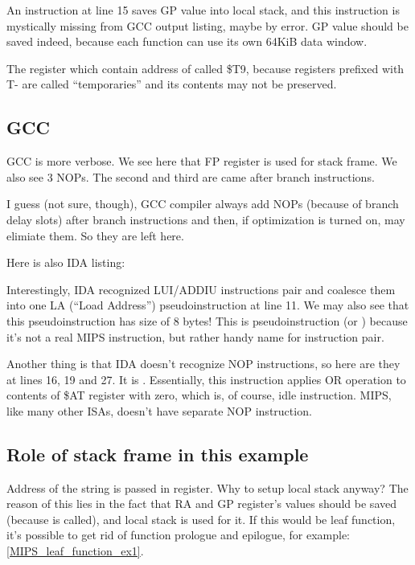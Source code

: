 An instruction at line 15 saves GP value into local stack, and this instruction is mystically missing
from GCC output listing, maybe by error.
GP value should be saved indeed, because each function can use its own 64KiB data window.

The register which contain address of \puts called \$T9, because registers prefixed with T- are called
``temporaries'' and its contents may not be preserved.

\subsection{\NonOptimizing GCC}



\NonOptimizing GCC is more verbose.
We see here that FP register is used for stack frame.
We also see 3 \ac{NOP}s.
The second and third are came after branch instructions.

I guess (not sure, though), GCC compiler always add \ac{NOP}s (because of branch delay slots) after branch
instructions and then, if optimization is turned on, may elimiate them.
So they are left here.

Here is also IDA listing:



Interestingly, IDA recognized LUI/ADDIU instructions pair and coalesce them into one 
LA (``Load Address'') pseudoinstruction at line 11.
We may also see that this pseudoinstruction has size of 8 bytes!
This is pseudoinstruction (or ) because it's not a real MIPS instruction, but rather
handy name for instruction pair.

Another thing is that IDA doesn't recognize \ac{NOP} instructions, so here are they at lines 16, 19 and 27.
It is . Essentially, this instruction applies OR operation to contents of \$AT register
with zero, which is, of course, idle instruction. 
MIPS, like many other \ac{ISA}s, doesn't have separate \ac{NOP} instruction.

\subsection{Role of stack frame in this example}

Address of the string is passed in register. 
Why to setup local stack anyway?
The reason of this lies in the fact that \ac{RA} and GP register's values should be saved (because \printf
is called), and local stack is used for it.
If this would be \gls{leaf function}, it's possible to get rid of function prologue and epilogue,
for example: \ref{MIPS_leaf_function_ex1}.

\fi
